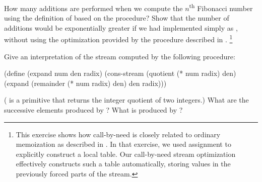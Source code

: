 \begin{exercise}
	\label{Exercise 3.57}
		How many additions are performed when we compute the \( n \)\textsuperscript{th} Fibonacci number using the definition of  based on the  procedure?
		Show that the number of additions would be exponentially greater if we had implemented  simply as , without using the optimization provided by the  procedure described in .%
	\footnote{
		This exercise shows how call-by-need is closely related to ordinary memoization as described in .
		In that exercise, we used assignment to explicitly construct a local table.
		Our call-by-need stream optimization effectively constructs such a table automatically, storing values in the previously forced parts of the stream.
	}
\end{exercise}



\begin{exercise}
	\label{Exercise 3.58}
	Give an interpretation of the stream computed by the following procedure:
	\begin{scheme}
	  (define (expand num den radix)
	    (cons-stream
	     (quotient (* num radix) den)
	     (expand (remainder (* num radix) den) den radix)))
	\end{scheme}
	( is a primitive that returns the integer quotient of two
	integers.)
	What are the successive elements produced by ?
	What is produced by ?
\end{exercise}

